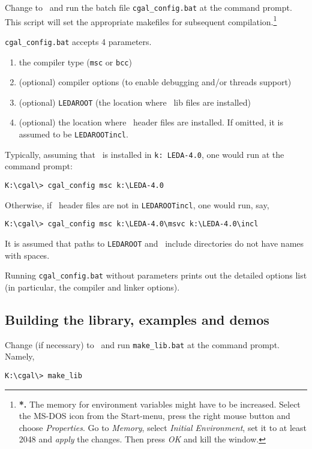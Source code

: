 Change to \CGALR\ and run the batch file \texttt{cgal\_config.bat} at the
command prompt.  This script will set the appropriate makefiles for
subsequent compilation.\footnote{
{\bf {}*.} 
The memory for environment variables might have to be increased.
Select the MS-DOS icon from the Start-menu, press the right mouse
button and choose \textit{Properties}. Go to \textit{Memory}, select
\textit{Initial Environment}, set it to at least 2048 and
\textit{apply} the changes. Then press \textit{OK} and kill the window.
}

\texttt{cgal\_config.bat} accepts 4 parameters.
\begin{enumerate}
\item the compiler type (\texttt{msc} or \texttt{bcc})
%
\item (optional) compiler options (to enable debugging and/or threads
                support)
%
\item (optional) \texttt{LEDAROOT} (the location where \leda\ lib files are installed)
%
\item (optional) the location where \leda\ header files are installed.
                If omitted, it is assumed to be 
\texttt{LEDAROOT\bslsh incl}.
\end{enumerate}

Typically, assuming that \leda\ is installed in \texttt{k:\bslsh
  LEDA-4.0}, one would run at the command prompt:
\begin{verbatim}
K:\cgal\> cgal_config msc k:\LEDA-4.0
\end{verbatim}

Otherwise, if \leda\ header files are not in \texttt{LEDAROOT\bslsh incl}, 
one would run, say,

\begin{verbatim}
K:\cgal\> cgal_config msc k:\LEDA-4.0\msvc k:\LEDA-4.0\incl
\end{verbatim}

It is assumed that paths to \texttt{LEDAROOT} and \leda\ include
directories do not have names with spaces.

Running \texttt{cgal\_config.bat} without parameters prints out the detailed
options list (in particular, the compiler and linker options).


\subsection{Building the library, examples and demos}

Change (if necessary)
to \CGALR\ and run \texttt{make\_lib.bat} at the command prompt. Namely,
\begin{verbatim}
K:\cgal\> make_lib
\end{verbatim}

